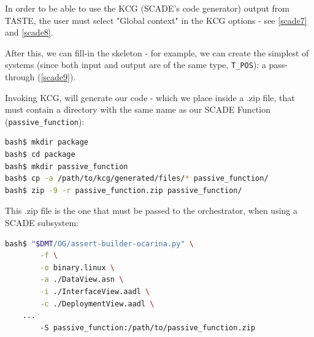 \documentclass[11pt]{book}
\begin{document}
In order to be able to use the KCG (SCADE's code generator) output from TASTE, the user must select "Global context"
in the KCG options - see \ref{scade7} and \ref{scade8}.

After this, we can fill-in the skeleton - for example, we can create the simplest of systems (since both input and 
output are of the same type, {\tt T\_POS}): a pass-through (\ref{scade9}).

Invoking KCG, will generate our code - which we place inside a .zip file, that must contain a directory with the same
name as our SCADE Function ({\tt passive\_function}):

\begin{lstlisting}[language=bash]
bash$ mkdir package
bash$ cd package
bash$ mkdir passive_function
bash$ cp -a /path/to/kcg/generated/files/* passive_function/
bash$ zip -9 -r passive_function.zip passive_function/
\end{lstlisting}

This .zip file is the one that must be passed to the orchestrator, when using a SCADE subsystem:

\begin{lstlisting}[language=bash]
bash$ "$DMT/OG/assert-builder-ocarina.py" \
        -f \
        -o binary.linux \
        -a ./DataView.asn \
        -i ./InterfaceView.aadl \
        -c ./DeploymentView.aadl \
	...
        -S passive_function:/path/to/passive_function.zip
\end{lstlisting}
\end{document}
